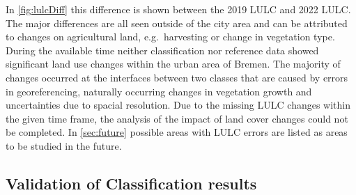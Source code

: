\documentclass[12pt,a4paper, english,twoside]{scrartcl}
\begin{document}
      \noindent
      In \cref{fig:lulcDiff} this difference is shown between the 2019 \gls{LULC} and 2022 \gls{LULC}.
      The major differences are all seen outside of the city area and can be attributed to changes on agricultural land, e.g.\ harvesting or change in vegetation type.
      During the available time neither classification nor reference data showed significant land use changes within the urban area of Bremen. 
      The majority of changes occurred at the interfaces between two classes that are caused by errors in georeferencing, naturally occurring changes in vegetation growth and uncertainties due to spacial resolution.
      Due to the missing \gls{LULC} changes within the given time frame, the analysis of the impact of land cover changes could not be completed. 
      In \cref{sec:future} possible areas with \gls{LULC} errors are listed as areas to be studied in the future.
      \newpage
    \subsection{Validation of Classification results}\label{sec:references}
      
\end{document}

